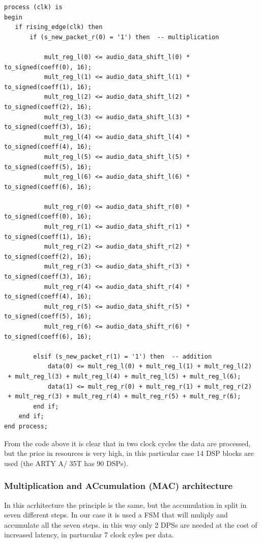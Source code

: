 \documentclass[11pt, a4paper]{article}
\begin{document}
\begin{lstlisting}[style={VHDL-style}]
process (clk) is
begin
   if rising_edge(clk) then
       if (s_new_packet_r(0) = '1') then  -- multiplication
            
           mult_reg_l(0) <= audio_data_shift_l(0) * to_signed(coeff(0), 16);
           mult_reg_l(1) <= audio_data_shift_l(1) * to_signed(coeff(1), 16);
           mult_reg_l(2) <= audio_data_shift_l(2) * to_signed(coeff(2), 16);
           mult_reg_l(3) <= audio_data_shift_l(3) * to_signed(coeff(3), 16);
           mult_reg_l(4) <= audio_data_shift_l(4) * to_signed(coeff(4), 16);
           mult_reg_l(5) <= audio_data_shift_l(5) * to_signed(coeff(5), 16);
           mult_reg_l(6) <= audio_data_shift_l(6) * to_signed(coeff(6), 16);

           mult_reg_r(0) <= audio_data_shift_r(0) * to_signed(coeff(0), 16);
           mult_reg_r(1) <= audio_data_shift_r(1) * to_signed(coeff(1), 16);
           mult_reg_r(2) <= audio_data_shift_r(2) * to_signed(coeff(2), 16);
           mult_reg_r(3) <= audio_data_shift_r(3) * to_signed(coeff(3), 16);
           mult_reg_r(4) <= audio_data_shift_r(4) * to_signed(coeff(4), 16);
           mult_reg_r(5) <= audio_data_shift_r(5) * to_signed(coeff(5), 16);
           mult_reg_r(6) <= audio_data_shift_r(6) * to_signed(coeff(6), 16);

        elsif (s_new_packet_r(1) = '1') then  -- addition
            data(0) <= mult_reg_l(0) + mult_reg_l(1) + mult_reg_l(2)
 + mult_reg_l(3) + mult_reg_l(4) + mult_reg_l(5) + mult_reg_l(6);
            data(1) <= mult_reg_r(0) + mult_reg_r(1) + mult_reg_r(2)
 + mult_reg_r(3) + mult_reg_r(4) + mult_reg_r(5) + mult_reg_r(6);
        end if;
    end if;
end process;
\end{lstlisting}

From the code above it is clear that in two clock cycles the data are processed, but the price in resources is very high, in this particular case 14 DSP blocks are used (the ARTY A/ 35T has 90 DSPs).


\subsubsection{Multiplication and ACcumulation (MAC) architecture}

In this acrhitecture the principle is the same, but the accumulation in split in seven different steps. In our case it is used a FSM that will muliply and accumulate all the seven steps.  
in this way only 2 DPSs are needed at the cost of increased latency, in partucular 7 clock cyles per data.
\end{document}
